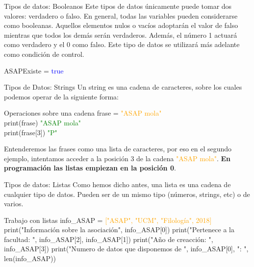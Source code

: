 \documentclass{beamer}
\begin{document}
\begin{frame}{Tipos de datos: Booleanos}
\label{datos:booleanos}
Este tipos de datos únicamente puede tomar dos valores: verdadero o falso. En general, todas las variables pueden considerarse como booleanas. Aquellos elementos nulos o vacíos adoptarán el valor de falso mientras que todos los demás serán verdaderos. Además, el número 1 actuará como verdadero y el 0 como falso.
Este tipo de datos se utilizará más adelante como condición de control.
\begin{Programexample}
\centering 
ASAPExiste = \textcolor{blue}{true}
\end{Programexample}
\end{frame}

\begin{frame} {Tipos de Datos: Strings}
\label{datos:strings}
Un string es una cadena de caracteres, sobre los cuales podemos operar de la siguiente forma:
\begin{Programexample} {Operaciones sobre una cadena}
frase = \textcolor{orange}{"ASAP mola"}\\
print(frase) \hspace{2.7cm} \textcolor{green}{"ASAP mola"}\\
print(frase[3])\hspace{2.4cm} \textcolor{green}{"P"}
\end{Programexample}
Entenderemos las frases como una lista de caracteres, por eso en el segundo ejemplo, intentamos acceder a la posición 3 de la cadena  \textcolor{orange}{"ASAP mola"}.
\textbf{En programación las listas empiezan en la posición 0}.
\end{frame}

\begin{frame}{Tipos de datos: Listas}
\label{datos:listas}
Como hemos dicho antes, una lista es una cadena de cualquier tipo de datos. Pueden ser de un mismo tipo (números, strings, etc) o de varios.
\begin{Programexample}{Trabajo con listas}
info\_ASAP = \textcolor{orange}{["ASAP", "UCM", "Filología", 2018]}
\newline\newline
print("Información sobre la asociación",  info\_ASAP[0])\newline
print("Pertenece a la facultad: ", info\_ASAP[2], info\_ASAP[1]) \newline
print("Año de creacción: ", info\_ASAP[3])\newline
print("Numero de datos que disponemos de ", info\_ASAP[0], ": ", len(info\_ASAP))
\end{Programexample}
\end{frame}
\end{document}

